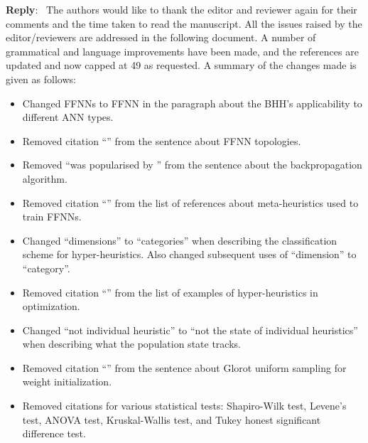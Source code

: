\documentclass[12pt]{article}
\newcounter{reviewer}
\newenvironment{reply}
   {\medskip \noindent \color{blue} \begin{sf}\textbf{Reply}:\  }
   {\medskip \par \end{sf}}
\begin{document}
\begin{reply}
	The authors would like to thank the editor and reviewer again for their comments and the time taken to read the manuscript. All the issues raised by the editor/reviewers are addressed in the following document. A number of grammatical and language improvements have been made, and the references are updated and now capped at 49 as requested. A summary of the changes made is given as follows:

	\begin{itemize}
		\item Changed FFNNs to FFNN in the paragraph about the BHH's applicability to different ANN types.

		\item Removed citation ``\citep{ref:zell:1994}'' from the sentence about FFNN topologies.
		\item Removed ``was popularised by \citet{ref:werbos:1994}'' from the sentence about the backpropagation algorithm.
		\item Removed citation ``\citep{ref:gupta:1999}'' from the list of references about meta-heuristics used to train FFNNs.
		\item Changed ``dimensions'' to ``categories'' when describing the classification scheme for hyper-heuristics. Also changed subsequent uses of ``dimension'' to ``category''.
		\item Removed citation ``\citep{ref:dowsland:2007}'' from the list of examples of hyper-heuristics in optimization.
		\item Changed ``not individual heuristic'' to ``not the state of individual heuristics'' when describing what the population state tracks.
		\item Removed citation ``\citep{ref:glorot:2010}'' from the sentence about Glorot uniform sampling for weight initialization.
		\item Removed citations for various statistical tests: Shapiro-Wilk test, Levene's test, ANOVA test, Kruskal-Wallis test, and Tukey honest significant difference test.
	\end{itemize}

\end{reply}



\end{document}
